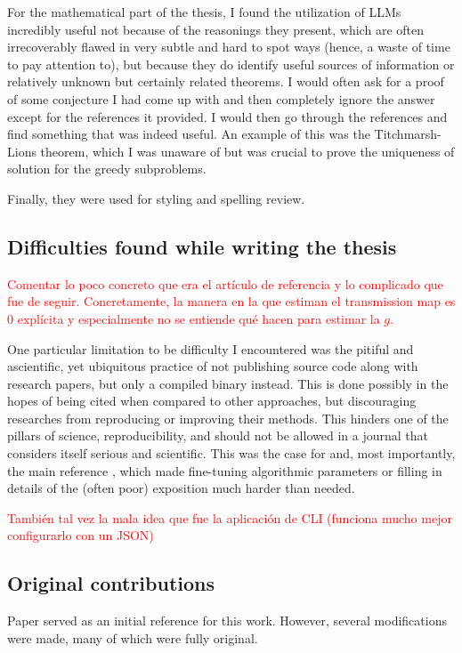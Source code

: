 \documentclass[twocolumn,twoside,a4paper,10pt]{IEEEtran}
\newcommand{\Frank}[1]{\textcolor{red}{#1}}
\begin{document}
For the mathematical part of the thesis, I found the utilization of LLMs
incredibly useful not because of the reasonings they present, which are often
irrecoverably flawed in very subtle and hard to spot ways (hence, a waste of
time to pay attention to), but because they do
identify useful sources of information or relatively unknown but certainly related theorems. I would often ask for a proof of some conjecture I had come up with and then completely ignore the answer except for the references it provided. I would then go through the references and find something that was indeed useful. An example of this was the Titchmarsh-Lions theorem, which I was unaware of but was crucial to prove the uniqueness of solution for the greedy subproblems.

Finally, they were used for styling and spelling review.

\subsection{Difficulties found while writing the thesis}
\Frank{
Comentar lo poco concreto que era el artículo de referencia y lo complicado que fue de seguir. Concretamente, la manera en la que estiman el transmission map es 0 explícita y especialmente no se entiende qué hacen para estimar la \(g\).
}

One particular limitation to be difficulty I encountered was the pitiful and ascientific, yet ubiquitous practice of not publishing
source code along with research papers, but only a compiled binary instead. This is done
possibly in the hopes of being cited when compared to other approaches, but discouraging researches from reproducing or improving their methods. This hinders
one of the pillars of science, reproducibility, and should not be allowed in
a journal that considers itself serious and scientific. This was the case for \cite{7574330} and, most importantly, the main reference \cite{xie2021variational}, which made fine-tuning algorithmic parameters or
filling in details of the (often poor) exposition much harder than needed.

\Frank{También tal vez la mala idea que fue la aplicación de CLI (funciona mucho mejor configurarlo con un JSON)}
\subsection{Original contributions}
Paper \cite{xie2021variational} served as an initial reference for this work. However, several modifications were made, many of which were fully original.
\end{document}
